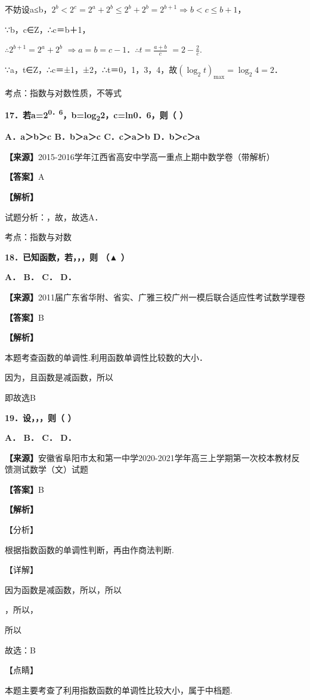 不妨设a≤b，\(2^{b} < 2^{c} = 2^{a} + 2^{b} \leq 2^{b} + 2^{b} = 2^{b + 1} \Rightarrow b < c \leq b + 1\)，

∵b，c∈Z，∴c＝b＋1，

\(\therefore 2^{b + 1} = 2^{a} + 2^{b}\)
\(\Rightarrow a = b = c - 1\)．\(\therefore t = \frac{a + b}{c}\)
\(= 2 - \frac{2}{c}\).

∵a，t∈Z，∴c＝±1，±2，∴t＝0，1，3，4，故\({(\log_{2}t)}_{\max} = \log_{2}4 = 2\)．

考点：指数与对数性质，不等式

\textbf{17．若a=2\textsuperscript{0．6}，b=log\textsubscript{2}2，c=ln0．6，则（
）}

\textbf{A．a＞b＞c B．b＞a＞c C．c＞a＞b D．b＞c＞a}

\textbf{【来源】}2015-2016学年江西省高安中学高一重点上期中数学卷（带解析）

\textbf{【答案】}A

\textbf{【解析】}

试题分析：，故，故选A．

考点：指数与对数

\textbf{18．已知函数，若，，，则 （▲ ）}

\textbf{A． B． C． D．}

\textbf{【来源】}2011届广东省华附、省实、广雅三校广州一模后联合适应性考试数学理卷

\textbf{【答案】}B

\textbf{【解析】}

本题考查函数的单调性.利用函数单调性比较数的大小．

因为，且函数是减函数，所以

即故选B

\textbf{19．设，，，则（ ）}

\textbf{A． B． C． D．}

\textbf{【来源】}安徽省阜阳市太和第一中学2020-2021学年高三上学期第一次校本教材反馈测试数学（文）试题

\textbf{【答案】}B

\textbf{【解析】}

【分析】

根据指数函数的单调性判断，再由作商法判断.

【详解】

因为函数是减函数，所以，所以

，所以，

所以

故选：B

【点睛】

本题主要考查了利用指数函数的单调性比较大小，属于中档题.

